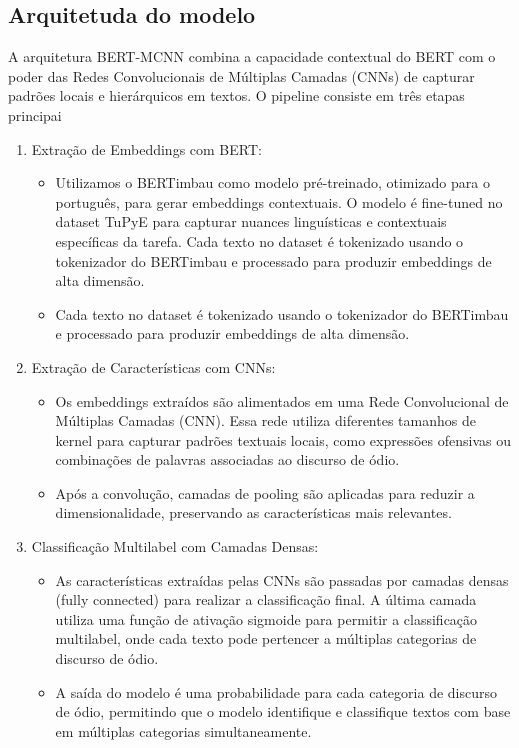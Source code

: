 \documentclass[sigconf,nonacm]{acmart}
\begin{document}
\subsection{Arquitetuda do modelo}

A arquitetura BERT-MCNN combina a capacidade contextual do BERT com o poder das Redes Convolucionais de Múltiplas Camadas (CNNs) de capturar padrões locais e hierárquicos em textos. O pipeline consiste em três etapas principai

\begin{enumerate}
  \item Extração de Embeddings com BERT: 
  \begin{itemize}
    \item Utilizamos o BERTimbau\cite{souza2020bertimbau} como modelo pré-treinado, otimizado para o português, para gerar embeddings contextuais. O modelo é fine-tuned no dataset TuPyE para capturar nuances linguísticas e contextuais específicas da tarefa. Cada texto no dataset é tokenizado usando o tokenizador do BERTimbau e processado para produzir embeddings de alta dimensão.
    \item Cada texto no dataset é tokenizado usando o tokenizador do BERTimbau e processado para produzir embeddings de alta dimensão.  
  \end{itemize}

  \item Extração de Características com CNNs:
  \begin{itemize}
    \item Os embeddings extraídos são alimentados em uma Rede Convolucional de Múltiplas Camadas (CNN). Essa rede utiliza diferentes tamanhos de kernel para capturar padrões textuais locais, como expressões ofensivas ou combinações de palavras associadas ao discurso de ódio.
    \item Após a convolução, camadas de pooling são aplicadas para reduzir a dimensionalidade, preservando as características mais relevantes.
  \end{itemize}

  \item Classificação Multilabel com Camadas Densas:
  \begin{itemize}
    \item As características extraídas pelas CNNs são passadas por camadas densas (fully connected) para realizar a classificação final. A última camada utiliza uma função de ativação sigmoide para permitir a classificação multilabel, onde cada texto pode pertencer a múltiplas categorias de discurso de ódio.
    \item A saída do modelo é uma probabilidade para cada categoria de discurso de ódio, permitindo que o modelo identifique e classifique textos com base em múltiplas categorias simultaneamente.
  \end{itemize}


\end{enumerate}
\end{document}
